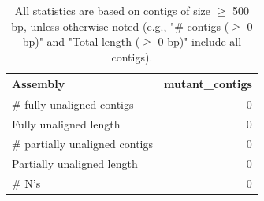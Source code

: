 \documentclass[12pt,a4paper]{article}
\begin{document}
\begin{table}[ht]
\begin{center}
\caption{All statistics are based on contigs of size $\geq$ 500 bp, unless otherwise noted (e.g., "\# contigs ($\geq$ 0 bp)" and "Total length ($\geq$ 0 bp)" include all contigs).}
\begin{tabular}{|l*{1}{|r}|}
\hline
Assembly & mutant\_contigs \\ \hline
\# fully unaligned contigs & 0 \\ \hline
Fully unaligned length & 0 \\ \hline
\# partially unaligned contigs & 0 \\ \hline
Partially unaligned length & 0 \\ \hline
\# N's & 0 \\ \hline
\end{tabular}
\end{center}
\end{table}
\end{document}
